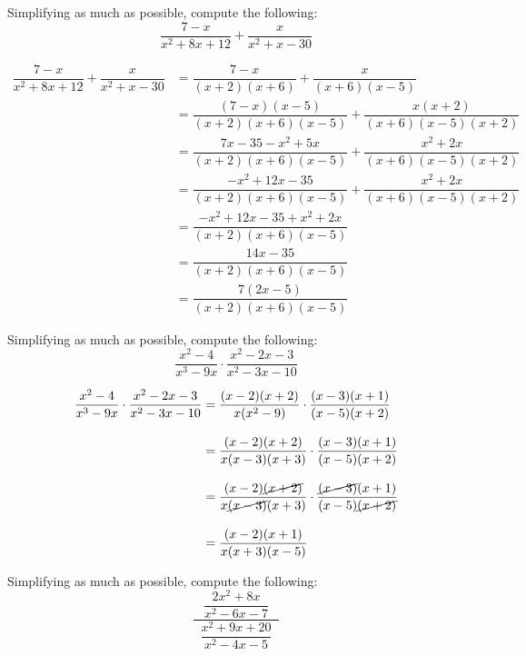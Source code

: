 \documentclass[11pt,letterpaper]{article}
\begin{document}
\newpage



 Simplifying as much as possible, compute the following:
	\[
	\dfrac{7 - x}{x^2 + 8x + 12} + \dfrac{x}{x^2 + x - 30}
	\] \pspace

\sol
	\[
	\begin{aligned}
	\dfrac{7 - x}{x^2 + 8x + 12} + \dfrac{x}{x^2 + x - 30}&= \dfrac{7 - x}{(x + 2)(x + 6)} + \dfrac{x}{(x + 6)(x - 5)} \\[0.3cm]
	&= \dfrac{(7 - x)(x - 5)}{(x + 2)(x + 6)(x - 5)} + \dfrac{x(x + 2)}{(x + 6)(x - 5)(x + 2)} \\[0.3cm]
	&= \dfrac{7x - 35 - x^2 + 5x}{(x + 2)(x + 6)(x - 5)} + \dfrac{x^2 + 2x}{(x + 6)(x - 5)(x + 2)} \\[0.3cm]
	&= \dfrac{-x^2 + 12x - 35}{(x + 2)(x + 6)(x - 5)} + \dfrac{x^2 + 2x}{(x + 6)(x - 5)(x + 2)} \\[0.3cm]
	&= \dfrac{-x^2 + 12x - 35 + x^2 + 2x}{(x + 2)(x + 6)(x - 5)} \\[0.3cm]
	&= \dfrac{14x - 35}{(x + 2)(x + 6)(x - 5)} \\[0.3cm]
	&= \dfrac{7(2x - 5)}{(x + 2)(x + 6)(x - 5)}
	\end{aligned}
	\]



\newpage



 Simplifying as much as possible, compute the following:
	\[
	\dfrac{x^2 - 4}{x^3 - 9x} \cdot \dfrac{x^2 - 2x - 3}{x^2 - 3x - 10}
	\] \pspace

\sol
	\[
	\begin{aligned}
	\dfrac{x^2 - 4}{x^3 - 9x} \cdot \dfrac{x^2 - 2x - 3}{x^2 - 3x - 10}&= \dfrac{(x - 2)(x + 2)}{x(x^2 - 9)} \cdot \dfrac{(x - 3)(x + 1)}{(x - 5)(x + 2)} \\[0.3cm]
	&= \dfrac{(x - 2)(x + 2)}{x(x - 3)(x + 3)} \cdot \dfrac{(x - 3)(x + 1)}{(x - 5)(x + 2)} \\[0.3cm]
	&= \dfrac{(x - 2)\cancel{(x + 2)}}{x \cancel{(x - 3)}(x + 3)} \cdot \dfrac{\cancel{(x - 3)}(x + 1)}{(x - 5)\cancel{(x + 2)}} \\[0.3cm]
	&= \dfrac{(x - 2)(x + 1)}{x (x + 3)(x - 5)}
	\end{aligned}
	\]



\newpage



 Simplifying as much as possible, compute the following:
	\[
	\dfrac{\;\;\dfrac{2x^2 + 8x}{x^2 - 6x - 7}\;\;}{\;\;\dfrac{x^2 + 9x + 20}{x^2 - 4x - 5}\;\;}
	\] \pspace
\end{document}
